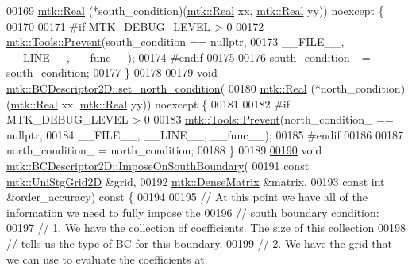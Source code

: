 \begin{DoxyCode}
00169     \hyperlink{group__c01-roots_gac080bbbf5cbb5502c9f00405f894857d}{mtk::Real} (*south\_condition)(\hyperlink{group__c01-roots_gac080bbbf5cbb5502c9f00405f894857d}{mtk::Real} xx, \hyperlink{group__c01-roots_gac080bbbf5cbb5502c9f00405f894857d}{mtk::Real} yy)) noexcept \{
00170 
00171 \textcolor{preprocessor}{  #if MTK\_DEBUG\_LEVEL > 0}
00172   \hyperlink{classmtk_1_1Tools_a332324c6f25e66be9dff48c5987a3b9f}{mtk::Tools::Prevent}(south\_condition == \textcolor{keyword}{nullptr},
00173                       \_\_FILE\_\_, \_\_LINE\_\_, \_\_func\_\_);
00174 \textcolor{preprocessor}{  #endif}
00175 
00176   south\_condition\_ = south\_condition;
00177 \}
00178 
\hypertarget{mtk__bc__descriptor__2d_8cc_source_l00179}{}\hyperlink{classmtk_1_1BCDescriptor2D_a690f6881a88b202c074d9f90f2a7ddb0}{00179} \textcolor{keywordtype}{void} \hyperlink{classmtk_1_1BCDescriptor2D_a690f6881a88b202c074d9f90f2a7ddb0}{mtk::BCDescriptor2D::set\_north\_condition}(
00180     \hyperlink{group__c01-roots_gac080bbbf5cbb5502c9f00405f894857d}{mtk::Real} (*north\_condition)(\hyperlink{group__c01-roots_gac080bbbf5cbb5502c9f00405f894857d}{mtk::Real} xx, \hyperlink{group__c01-roots_gac080bbbf5cbb5502c9f00405f894857d}{mtk::Real} yy)) noexcept \{
00181 
00182 \textcolor{preprocessor}{  #if MTK\_DEBUG\_LEVEL > 0}
00183   \hyperlink{classmtk_1_1Tools_a332324c6f25e66be9dff48c5987a3b9f}{mtk::Tools::Prevent}(north\_condition\_ == \textcolor{keyword}{nullptr},
00184                       \_\_FILE\_\_, \_\_LINE\_\_, \_\_func\_\_);
00185 \textcolor{preprocessor}{  #endif}
00186 
00187   north\_condition\_ = north\_condition;
00188 \}
00189 
\hypertarget{mtk__bc__descriptor__2d_8cc_source_l00190}{}\hyperlink{classmtk_1_1BCDescriptor2D_acba15639218e80fd93aff482b185201e}{00190} \textcolor{keywordtype}{void} \hyperlink{classmtk_1_1BCDescriptor2D_acba15639218e80fd93aff482b185201e}{mtk::BCDescriptor2D::ImposeOnSouthBoundary}(
00191     \textcolor{keyword}{const} \hyperlink{classmtk_1_1UniStgGrid2D}{mtk::UniStgGrid2D} &grid,
00192     \hyperlink{classmtk_1_1DenseMatrix}{mtk::DenseMatrix} &matrix,
00193     \textcolor{keyword}{const} \textcolor{keywordtype}{int} &order\_accuracy)\textcolor{keyword}{ const }\{
00194 
00195   \textcolor{comment}{// At this point we have all of the information we need to fully impose the}
00196   \textcolor{comment}{// south boundary condition:}
00197   \textcolor{comment}{// 1. We have the collection of coefficients. The size of this collection}
00198   \textcolor{comment}{// tells us the type of BC for this boundary.}
00199   \textcolor{comment}{// 2. We have the grid that we can use to evaluate the coefficients at.}

\end{DoxyCode}
